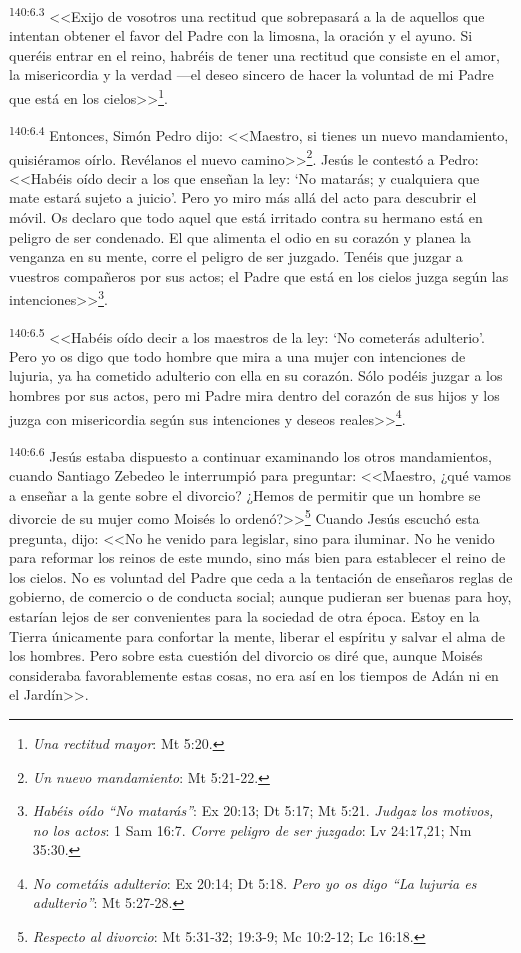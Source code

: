 \par 
\textsuperscript{140:6.3} <<Exijo de vosotros una rectitud que sobrepasará a la de aquellos que intentan obtener el favor del Padre con la limosna, la oración y el ayuno. Si queréis entrar en el reino, habréis de tener una rectitud que consiste en el amor, la misericordia y la verdad ---el deseo sincero de hacer la voluntad de mi Padre que está en los cielos>>\footnote{\textit{Una rectitud mayor}: Mt 5:20.}.

\par 
\textsuperscript{140:6.4} Entonces, Simón Pedro dijo: <<Maestro, si tienes un nuevo mandamiento, quisiéramos oírlo. Revélanos el nuevo camino>>\footnote{\textit{Un nuevo mandamiento}: Mt 5:21-22.}. Jesús le contestó a Pedro: <<Habéis oído decir a los que enseñan la ley: `No matarás; y cualquiera que mate estará sujeto a juicio'. Pero yo miro más allá del acto para descubrir el móvil. Os declaro que todo aquel que está irritado contra su hermano está en peligro de ser condenado. El que alimenta el odio en su corazón y planea la venganza en su mente, corre el peligro de ser juzgado. Tenéis que juzgar a vuestros compañeros por sus actos; el Padre que está en los cielos juzga según las intenciones>>\footnote{\textit{Habéis oído ``No matarás''}: Ex 20:13; Dt 5:17; Mt 5:21. \textit{Judgaz los motivos, no los actos}: 1 Sam 16:7. \textit{Corre peligro de ser juzgado}: Lv 24:17,21; Nm 35:30.}.

\par 
\textsuperscript{140:6.5} <<Habéis oído decir a los maestros de la ley: `No cometerás adulterio'. Pero yo os digo que todo hombre que mira a una mujer con intenciones de lujuria, ya ha cometido adulterio con ella en su corazón. Sólo podéis juzgar a los hombres por sus actos, pero mi Padre mira dentro del corazón de sus hijos y los juzga con misericordia según sus intenciones y deseos reales>>\footnote{\textit{No cometáis adulterio}: Ex 20:14; Dt 5:18. \textit{Pero yo os digo ``La lujuria es adulterio''}: Mt 5:27-28.}.

\par 
\textsuperscript{140:6.6} Jesús estaba dispuesto a continuar examinando los otros mandamientos, cuando Santiago Zebedeo le interrumpió para preguntar: <<Maestro, ¿qué vamos a enseñar a la gente sobre el divorcio? ¿Hemos de permitir que un hombre se divorcie de su mujer como Moisés lo ordenó?>>\footnote{\textit{Respecto al divorcio}: Mt 5:31-32; 19:3-9; Mc 10:2-12; Lc 16:18.} Cuando Jesús escuchó esta pregunta, dijo: <<No he venido para legislar, sino para iluminar. No he venido para reformar los reinos de este mundo, sino más bien para establecer el reino de los cielos. No es voluntad del Padre que ceda a la tentación de enseñaros reglas de gobierno, de comercio o de conducta social; aunque pudieran ser buenas para hoy, estarían lejos de ser convenientes para la sociedad de otra época. Estoy en la Tierra únicamente para confortar la mente, liberar el espíritu y salvar el alma de los hombres. Pero sobre esta cuestión del divorcio os diré que, aunque Moisés consideraba favorablemente estas cosas, no era así en los tiempos de Adán ni en el Jardín>>.

